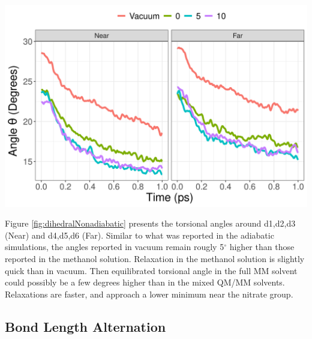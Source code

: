 \noindent
\begin{minipage}[c]{\textwidth}
  \centering
  \includegraphics[width=\textwidth]{../Paper2/Images/dihedral/solvent_comparison.png}
  \label{fig:dihedralNonadiabatic}
\end{minipage}\bigskip

Figure \ref{fig:dihedralNonadiabatic} presents the torsional angles around d1,d2,d3 (Near) and d4,d5,d6 (Far).
Similar to what was reported in the adiabatic simulations, the angles reported in vacuum remain rougly 5\(^\circ\) higher than those reported in the methanol solution.
Relaxation in the methanol solution is slightly quick than in vacuum.
Then equilibrated torsional angle in the full MM solvent could possibly be a few degrees higher than in the mixed QM/MM solvents.
Relaxations are faster, and approach a lower minimum near the nitrate group.

\subsection{Bond Length Alternation}

